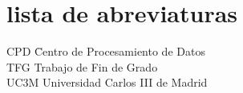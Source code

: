 \newpage %
\thispagestyle{empty}
\mbox{}

\chapter*{lista de abreviaturas}
\begin{tabbing}	 %
	CPD	\quad\quad\=	Centro de Procesamiento de Datos \\
	TFG	\>	Trabajo de Fin de Grado \\
	UC3M	\>	Universidad Carlos III de Madrid
\end{tabbing}